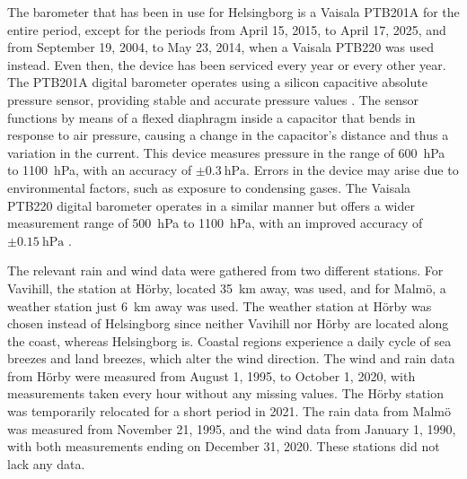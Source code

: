 The barometer that has been in use for Helsingborg is a Vaisala PTB201A for the entire period, except for the periods from April 15, 2015, to April 17, 2025, and from September 19, 2004, to May 23, 2014, when a Vaisala PTB220 was used instead. Even then, the device has been serviced every year or every other year. The PTB201A digital barometer operates using a silicon capacitive absolute pressure sensor, providing stable and accurate pressure values \cite{vaisalaPTB200DIGITAL1993}. The sensor functions by means of a flexed diaphragm inside a capacitor that bends in response to air pressure, causing a change in the capacitor’s distance and thus a variation in the current. This device measures pressure in the range of \SI{600}{\hecto\pascal} to \SI{1100}{\hecto\pascal}, with an accuracy of $\pm\SI{0.3}{\hecto\pascal}$. Errors in the device may arise due to environmental factors, such as exposure to condensing gases. The Vaisala PTB220 digital barometer operates in a similar manner but offers a wider measurement range of \SI{500}{\hecto\pascal} to \SI{1100}{\hecto\pascal}, with an improved accuracy of $\pm\SI{0.15}{\hecto\pascal}$ \cite{vaisalaPTB220SeriesDigital2001}.

The relevant rain and wind data were gathered from two different stations. For Vavihill, the station at Hörby, located \SI{35}{\km} away, was used, and for Malmö, a weather station just \SI{6}{\km} away was used. The weather station at Hörby was chosen instead of Helsingborg since neither Vavihill nor Hörby are located along the coast, whereas Helsingborg is. Coastal regions experience a daily cycle of sea breezes and land breezes, which alter the wind direction. The wind and rain data from Hörby were measured from August 1, 1995, to October 1, 2020, with measurements taken every hour without any missing values. The Hörby station was temporarily relocated for a short period in 2021. The rain data from Malmö was measured from November 21, 1995, and the wind data from January 1, 1990, with both measurements ending on December 31, 2020. These stations did not lack any data.

